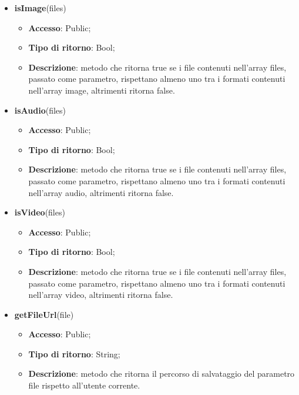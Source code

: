 {\begin{itemize}
\begin{itemize}
				\item \textbf{Tipo di ritorno}: Void;
				\item \textbf{Descrizione}: metodo che invia una richiesta XMLHttpRequest a \textit{[hostname]\-/private/api/files//} effettuando l'upload dei file contenuti nell'array files passato come parametro. Se l'operazione ha successo viene richiamato callback, altrimenti viene lanciato un errore.
			\end{itemize}
			\item \textbf{isImage}(files)
			\begin{itemize}
				\item \textbf{Accesso}: Public;
				\item \textbf{Tipo di ritorno}: Bool;
				\item \textbf{Descrizione}: metodo che ritorna true se i file contenuti nell'array files, passato come parametro, rispettano almeno uno tra i formati contenuti nell'array image, altrimenti ritorna false.
			\end{itemize}
			\item \textbf{isAudio}(files)
			\begin{itemize}
				\item \textbf{Accesso}: Public;
				\item \textbf{Tipo di ritorno}: Bool;
				\item \textbf{Descrizione}: metodo che ritorna true se i file contenuti nell'array files, passato come parametro, rispettano almeno uno tra i formati contenuti nell'array audio, altrimenti ritorna false.
			\end{itemize}
			\item \textbf{isVideo}(files)
			\begin{itemize}
				\item \textbf{Accesso}: Public;
				\item \textbf{Tipo di ritorno}: Bool;
				\item \textbf{Descrizione}: metodo che ritorna true se i file contenuti nell'array files, passato come parametro, rispettano almeno uno tra i formati contenuti nell'array video, altrimenti ritorna false.
			\end{itemize}
			\item \textbf{getFileUrl}(file)
			\begin{itemize}
				\item \textbf{Accesso}: Public;
				\item \textbf{Tipo di ritorno}: String;
				\item \textbf{Descrizione}: metodo che ritorna il percorso di salvataggio del parametro file rispetto all'utente corrente.
			\end{itemize}
		\end{itemize} 
}

